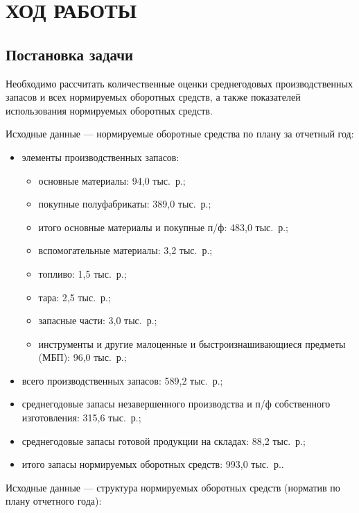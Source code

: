 \section{ХОД РАБОТЫ}

\subsection{Постановка задачи}

Необходимо рассчитать количественные оценки среднегодовых производственных запасов
и всех нормируемых оборотных средств, а также показателей использования
нормируемых оборотных средств.

Исходные данные --- нормируемые оборотные средства по плану за отчетный год:
\begin{itemize}
\item элементы производственных запасов:
  \begin{itemize}
  \item основные материалы: 94{,}0 тыс.~р.;
  \item покупные полуфабрикаты: 389{,}0 тыс.~р.;
  \item итого основные материалы и покупные п/ф: 483{,}0 тыс.~р.;
  \item вспомогательные материалы: 3{,}2 тыс.~р.;
  \item топливо: 1{,}5 тыс.~р.;
  \item тара: 2{,}5 тыс.~р.;
  \item запасные части: 3{,}0 тыс.~р.;
  \item инструменты и другие малоценные и быстроизнашивающиеся предметы (МБП): 
    96{,}0 тыс.~р.;  
  \end{itemize}

  \item всего производственных запасов: 589{,}2 тыс.~р.;
  \item среднегодовые запасы незавершенного производства и
    п/ф собственного изготовления: 315{,}6 тыс.~р.;
  \item среднегодовые запасы готовой продукции на складах: 88{,}2 тыс.~р.;
  \item итого запасы нормируемых оборотных средств: 993{,}0 тыс.~р..
\end{itemize}

Исходные данные --- структура нормируемых оборотных средств
(норматив по плану отчетного года):

